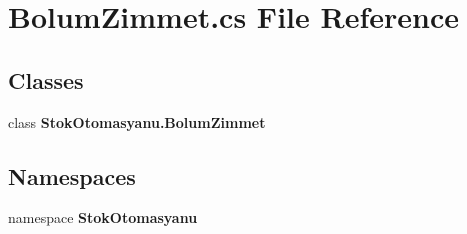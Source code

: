 \section{Bolum\+Zimmet.\+cs File Reference}
\label{_bolum_zimmet_8cs}
\subsection*{Classes}
\begin{DoxyCompactItemize}
\item 
class \textbf{ Stok\+Otomasyanu.\+Bolum\+Zimmet}
\end{DoxyCompactItemize}
\subsection*{Namespaces}
\begin{DoxyCompactItemize}
\item 
namespace \textbf{ Stok\+Otomasyanu}
\end{DoxyCompactItemize}
